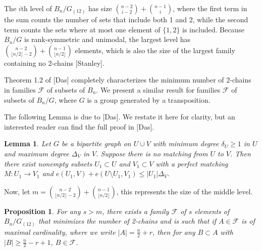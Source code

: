 \documentclass[12pt]{article}
\theoremstyle{plain}
\newtheorem{lemma}[theorem]{Lemma}
\newtheorem{proposition}[theorem]{Proposition}
\theoremstyle{definition}
\theoremstyle{remark}
\newcommand{\F}{\mathcal{F}}
\begin{document}
The $i$th level of $B_n / G_{(12)}$ has size $\binom{n-2}{i-2} + \binom{n-1}{i}$, where the first term in the sum counts the number of sets that include both 1 and 2, while the second term counts the sets where at most one element of $\{1,2\}$ is included. Because $B_n / G$ is rank-symmetric and unimodal, the largest level has $\binom{n-2}{\lfloor n/2 \rfloor -2} + \binom{n-1}{\lfloor n/2 \rfloor}$ elements, which is also the size of the largest family containing no 2-chains [Stanley].


Theorem 1.2 of [Das] completely characterizes the minimum number of 2-chains in families $\F$ of subsets of $B_n$. We present a similar result for families $\F$ of subsets of $B_n / G$, where $G$ is a group generated by a transposition.


The following Lemma is due to [Das]. We restate it here for clarity, but an interested reader can find the full proof in [Das].

\begin{lemma}
\label{lemma2}
Let $G$ be a bipartite graph on $U \cup V$ with minimum degree $\delta_U \geq 1$ in $U$ and maximum degree $\Delta_V$ in $V$. Suppose there is no matching from $U$ to $V$. Then there exist nonempty subsets $U_1 \subset U$ and $V_1 \subset V$ with a perfect matching $M: U_1 \to V_1$ and $e(U_1,V) + e(U \setminus U_1,V_1) \leq |U_1| \Delta_V$.
\end{lemma}

Now, let $m = \binom{n-2}{\lfloor n/2 \rfloor -2} + \binom{n-1}{\lfloor n/2 \rfloor}$, this represents the size of the middle level.

\begin{proposition}
\label{proposition1} For any $s > m$, there exists a family $\F$ of $s$ elements of $B_n / G_{(12)}$ that minimizes the number of 2-chains and is such that if $A \in \F$ is of maximal cardinality, where we write $|A| = \frac{n}{2}+r$, then for any $B \subset A$ with $|B| \geq \frac{n}{2} - r + 1$, $B \in \F$.
\end{proposition}
\end{document}
